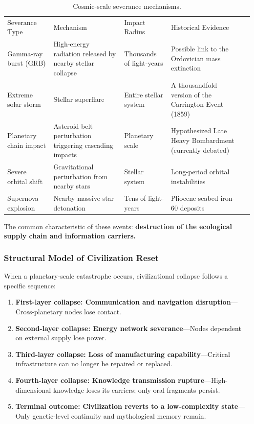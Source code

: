 \documentclass[aps,prd,twocolumn,superscriptaddress,nofootinbib]{revtex4-2}
\begin{document}
\begin{table}[htbp]
\caption{Cosmic-scale severance mechanisms.}
\label{tab:severance}
\begin{ruledtabular}
\begin{tabular}{lllll}
Severance Type & Mechanism & Impact Radius & Historical Evidence \\
\colrule
Gamma-ray burst (GRB) & High-energy radiation released by nearby stellar collapse & Thousands of light-years & Possible link to the Ordovician mass extinction \\
Extreme solar storm & Stellar superflare & Entire stellar system & A thousandfold version of the Carrington Event (1859)~\cite{Cliver2013} \\
Planetary chain impact & Asteroid belt perturbation triggering cascading impacts & Planetary scale & Hypothesized Late Heavy Bombardment (currently debated)~\cite{Gomes2005} \\
Severe orbital shift & Gravitational perturbation from nearby stars & Stellar system & Long-period orbital instabilities \\
Supernova explosion & Nearby massive star detonation & Tens of light-years & Pliocene seabed iron-60 deposits \\
\end{tabular}
\end{ruledtabular}
\end{table}

The common characteristic of these events: \textbf{destruction of the ecological supply chain and information carriers.}

\subsubsection{Structural Model of Civilization Reset}\label{sec:reset-model}

When a planetary-scale catastrophe occurs, civilizational collapse follows a specific sequence:

\begin{enumerate}
  \item \textbf{First-layer collapse: Communication and navigation disruption}---Cross-planetary nodes lose contact.
  \item \textbf{Second-layer collapse: Energy network severance}---Nodes dependent on external supply lose power.
  \item \textbf{Third-layer collapse: Loss of manufacturing capability}---Critical infrastructure can no longer be repaired or replaced.
  \item \textbf{Fourth-layer collapse: Knowledge transmission rupture}---High-dimensional knowledge loses its carriers; only oral fragments persist.
  \item \textbf{Terminal outcome: Civilization reverts to a low-complexity state}---Only genetic-level continuity and mythological memory remain.
\end{enumerate}
\end{document}
